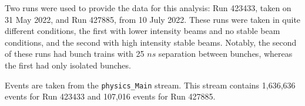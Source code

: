 
Two runs were used to provide the data for this analysis: Run 423433, taken on
31 May 2022, and Run 427885, from 10 July 2022. These runs were taken in quite
different conditions, the first with lower intensity beams and no stable
beam conditions, and the second with high intensity stable beams. Notably, the
second of these runs had bunch trains with 25 $ns$ separation between bunches,
whereas the first had only isolated bunches.

Events are taken from the \verb|physics_Main| stream. This stream contains
1,636,636 events for Run 423433 and 107,016 events for Run 427885.

